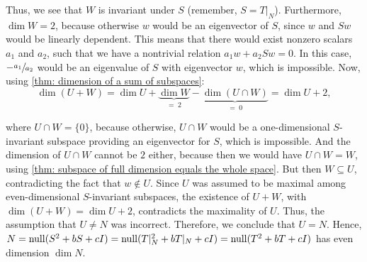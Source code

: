 \begin{prf}
  Thus, we see that $W$ is invariant under $S$ (remember, $S = T|_N$). Furthermore, $\dim W = 2$, because otherwise $w$ would be an eigenvector of $S$, since $w$ and $Sw$ would be linearly dependent. This means that there would exist nonzero scalars $a_1$ and $a_2$, such that we have a nontrivial relation $a_1w + a_2 Sw = 0$. In this case, $-\sfrac{a_1}{a_2}$ would be an eigenvalue of $S$ with eigenvector $w$, which is impossible. Now, using \ref{thm: dimension of a sum of subspaces}:
  \begin{equation}
    \dim (U + W) = \dim U + \underbrace{\dim W}_{= \; 2} - \underbrace{\dim (U \cap W)}_{= \; 0} = \dim U + 2,
  \end{equation}

  where $U \cap W = \{0\}$, because otherwise, $U \cap W$ would be a one-dimensional $S$-invariant subspace providing an eigenvector for $S$, which is impossible. And the dimension of $U \cap W$ cannot be $2$ either, because then we would have $U \cap W = W$, using \ref{thm: subspace of full dimension equals the whole space}. But then $W \subseteq U$, contradicting the fact that $w \notin U$. Since $U$ was assumed to be maximal among even-dimensional $S$-invariant subspaces, the existence of $U+W$, with $\dim (U+W)=\dim U+2$, contradicts the maximality of $U$.
  Thus, the assumption that $U \neq N$ was incorrect. Therefore, we conclude that $U = N$. Hence, $N= \operatorname{null} (S^2 +bS +cI)=\operatorname{null} (T|_N^2 +bT|_N +cI)=\operatorname{null} (T^2 +bT +cI)$ has even dimension $\dim N$.
\end{prf}

